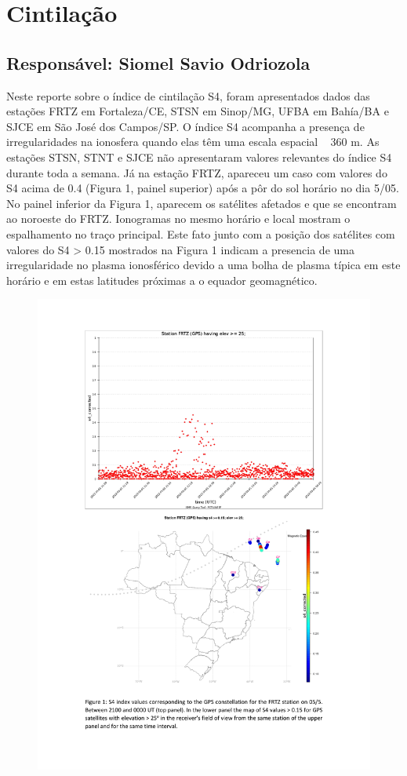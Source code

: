 \documentclass[11pt, oneside]{article}
\begin{document}
\section{Cintilação} 
 \subsection{Responsável: Siomel Savio Odriozola} 
 
Neste reporte sobre o índice de cintilação S4, foram apresentados dados das 
estações FRTZ em Fortaleza/CE, STSN em Sinop/MG, UFBA em Bahía/BA e 
SJCE em São José dos Campos/SP. O índice S4 acompanha a presença de 
irregularidades na ionosfera quando elas têm uma escala espacial ~ 360 m.  
As estações STSN, STNT e SJCE não apresentaram valores relevantes do 
índice S4 durante toda a semana. Já na estação FRTZ, apareceu um caso com 
valores do S4 acima de 0.4 (Figura 1, painel superior) após a pôr do sol horário 
no dia 5/05. No painel inferior da Figura 1, aparecem os satélites afetados e que 
se encontram ao noroeste do FRTZ. Ionogramas no mesmo horário e local 
mostram o espalhamento no traço principal. Este fato junto com a posição dos 
satélites com valores do S4 > 0.15 mostrados na Figura 1 indicam a presencia 
de uma irregularidade no plasma ionosférico devido a uma bolha de plasma 
típica em este horário e em estas latitudes próximas a o equador geomagnético. 

    \begin{figure}[H]
        \centering
        \includegraphics[width=14cm]{./figures/pt_outfileScint_0.jpg}
    \end{figure} 
 
\end{document}
